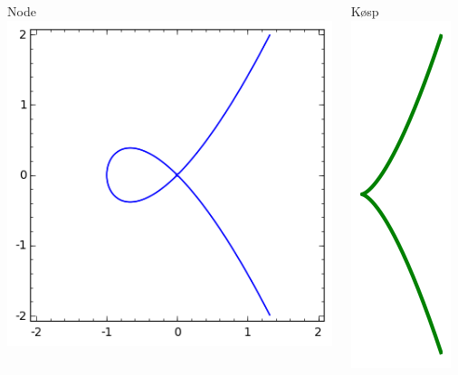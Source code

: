 \documentclass[norsk]{beamer}
\begin{document}
\begin{frame}

  \begin{columns}[T]
    \begin{column}{.5\textwidth}
     \begin{block}{Node}
\includegraphics[scale=0.8]{presentasjon/node.png}
    \end{block}
    \end{column}
    \begin{column}{.5\textwidth}
    \begin{block}{Køsp}
\includegraphics[scale=0.8]{presentasjon/cusp.png}
    \end{block}
    \end{column}
   \end{columns}


\end{frame}
\end{document}
